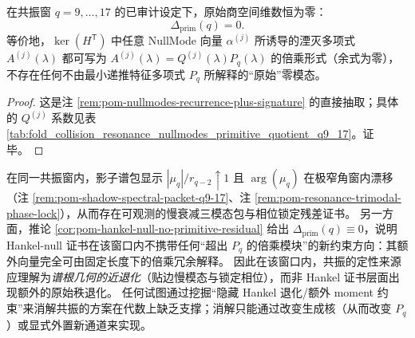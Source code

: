 \begin{corollary}\label{cor:pom-hankel-null-no-primitive-residual}
在共振窗 \(q=9,\dots,17\) 的已审计设定下，原始商空间维数恒为零：
\[
\Delta_{\mathrm{prim}}(q)=0.
\]
等价地，\(\ker(H^{\mathsf T})\) 中任意 NullMode 向量 \(\alpha^{(j)}\) 所诱导的湮灭多项式 \(A^{(j)}(\lambda)\) 都可写为
\(
A^{(j)}(\lambda)=Q^{(j)}(\lambda)P_q(\lambda)
\)
的倍乘形式（余式为零），不存在任何不由最小递推特征多项式 \(P_q\) 所解释的“原始”零模态。
\end{corollary}
\begin{proof}
这是注 \ref{rem:pom-nullmodes-recurrence-plus-signature} 的直接抽取；具体的 \(Q^{(j)}\) 系数见表 \ref{tab:fold_collision_resonance_nullmodes_primitive_quotient_q9_17}。证毕。
\end{proof}



\begin{remark}\label{rem:pom-resonance-spectral-not-hankel-degeneracy}
在同一共振窗内，影子谱包显示 \(|\mu_q|/r_{q-2}\uparrow 1\) 且 \(\arg(\mu_q)\) 在极窄角窗内漂移（注 \ref{rem:pom-shadow-spectral-packet-q9-17}、注 \ref{rem:pom-resonance-trimodal-phase-lock}），从而存在可观测的慢衰减三模态包与相位锁定残差证书。
另一方面，推论 \ref{cor:pom-hankel-null-no-primitive-residual} 给出 \(\Delta_{\mathrm{prim}}(q)\equiv 0\)，说明 Hankel-null 证书在该窗口内不携带任何“超出 \(P_q\) 的倍乘模块”的新约束方向：其额外向量完全可由固定长度下的倍乘冗余解释。
因此在该窗口内，共振的定性来源应理解为\emph{谱根几何的近退化}（贴边慢模态与锁定相位），而非 Hankel 证书层面出现额外的原始秩退化。
任何试图通过挖掘“隐藏 Hankel 退化/额外 moment 约束”来消解共振的方案在代数上缺乏支撑；消解只能通过改变生成核（从而改变 \(P_q\)）或显式外置新通道来实现。
\end{remark}

